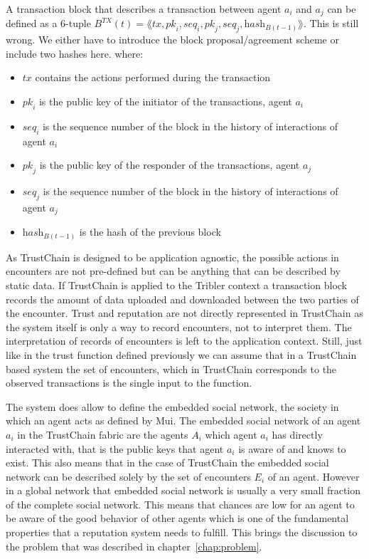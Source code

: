 \begin{defn}
    A transaction block that describes a transaction between agent $a_i$ and $a_j$ can be defined as 
    a 6-tuple $B^{TX}(t) = \lAngle \textit{tx}, \textit{pk}_i, \textit{seq}_i, \textit{pk}_j, \textit{seq}_j, \textit{hash}_{B(t-1)} \rAngle$.
    {\color{red}This is still wrong. We either have to introduce the block proposal/agreement scheme or include two hashes here. }
    where:
        \begin{itemize}
            \item $\textit{tx}$ contains the actions performed during the transaction
            \item $\textit{pk}_i$ is the public key of the initiator of the transactions, agent $a_i$
            \item $\textit{seq}_i$ is the sequence number of the block in the history of interactions of agent $a_i$
            \item $\textit{pk}_j$ is the public key of the responder of the transactions, agent $a_j$
            \item $\textit{seq}_j$ is the sequence number of the block in the history of interactions of agent $a_j$
            \item $\textit{hash}_{B(t-1)}$ is the hash of the previous block
        \end{itemize}
\end{defn}

As TrustChain is designed to be application agnostic, the possible actions in encounters are
not pre-defined but can be anything that can be described by static data. If TrustChain is applied
to the Tribler context a transaction block records the amount of data uploaded and downloaded between
the two parties of the encounter. Trust and reputation are not directly represented in TrustChain as
the system itself is only a way to record encounters, not to interpret them. The interpretation of
records of encounters is left to the application context. Still, just like in the trust function 
defined previously we can assume that in a TrustChain based system the set of encounters, which in 
TrustChain corresponds to the observed transactions is the single input to the function.

The system does allow to define the embedded social network, the society in which an agent acts as
defined by Mui. The embedded social network of an agent $a_i$ in the TrustChain fabric are the 
agents $A_i$ which agent $a_i$ has directly interacted with, that is the public keys that agent $a_i$
is aware of and knows to exist. This also means that in the case of TrustChain the embedded social
network can be described solely by the set of encounters $E_i$ of an agent. 
However in a global network that embedded social network is usually 
a very small fraction of the complete social network. This means that chances are low for an agent to
be aware of the good behavior of other agents which is one of the fundamental properties that a 
reputation system needs to fulfill. This brings the discussion to the problem that was described in
chapter~\ref{chap:problem}.

